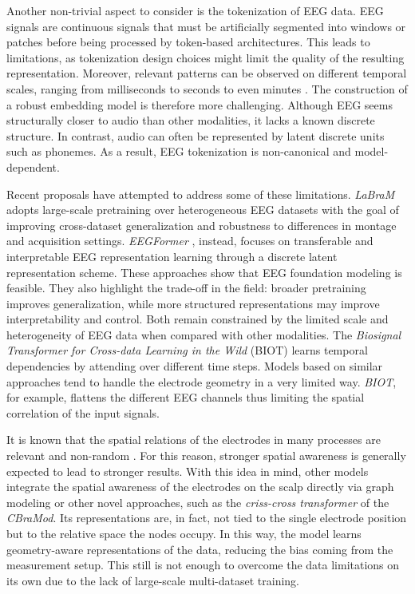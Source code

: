 Another non-trivial aspect to consider is the tokenization of EEG data.
EEG signals are continuous signals that must be artificially segmented into windows or patches before being processed by token-based architectures.
This leads to limitations, as tokenization design choices might limit the quality of the resulting representation.
Moreover, relevant patterns can be observed on different temporal scales, ranging from milliseconds to seconds to even minutes \cite{Olofsson2007-oj}.
The construction of a robust embedding model is therefore more challenging.
Although EEG seems structurally closer to audio than other modalities, it lacks a known discrete structure.
In contrast, audio can often be represented by latent discrete units such as phonemes.
As a result, EEG tokenization is non-canonical and model-dependent.


Recent proposals have attempted to address some of these limitations.
\textit{LaBraM} \cite{jiang2024largebrainmodellearning} adopts large-scale pretraining over heterogeneous EEG datasets with the goal of improving cross-dataset generalization and robustness to differences in montage and acquisition settings.
\textit{EEGFormer} \cite{chen2024eegformertransferableinterpretablelargescale}, instead, focuses on transferable and interpretable EEG representation learning through a discrete latent representation scheme.
These approaches show that EEG foundation modeling is feasible.
They also highlight the trade-off in the field: broader pretraining improves generalization, while more structured representations may improve interpretability and control.
Both remain constrained by the limited scale and heterogeneity of EEG data when compared with other modalities.
The \textit{Biosignal Transformer for Cross-data Learning in the Wild} (BIOT) \cite{NEURIPS2023_f6b30f3e} learns temporal dependencies by attending over different time steps.
Models based on similar approaches tend to handle the electrode geometry in a very limited way.
\textit{BIOT}, for example, flattens the different EEG channels thus limiting the spatial correlation of the input signals.

It is known that the spatial relations of the electrodes in many processes are relevant and non-random \cite{Gheorghiu2020-mn}.
For this reason, stronger spatial awareness is generally expected to lead to stronger results.
With this idea in mind, other models integrate the spatial awareness of the electrodes on the scalp directly via graph modeling or other
novel approaches, such as the \textit{criss-cross transformer} of the \textit{CBraMod}.
Its representations are, in fact, not tied to the single electrode position but to the relative space the nodes occupy.
In this way, the model learns geometry-aware representations of the data, reducing the bias coming from the measurement setup.
This still is not enough to overcome the data limitations on its own due to the lack of large-scale multi-dataset training.

